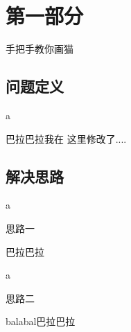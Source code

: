 \section{第一部分}
\begin{frame}{手把手教你画猫}
\end{frame}
\subsection{问题定义}
\begin{frame}{a}
	\begin{defi}
		巴拉巴拉我在 这里修改了....
	\end{defi}
\end{frame}
\subsection{解决思路}
\begin{frame}{a}
	\begin{solu}
		思路一
	\end{solu}
	\vspace{1.4cm}
	巴拉巴拉
\end{frame}

\begin{frame}{a}	
	\setcounter{solu}{1}
	\begin{solu}
		思路二
	\end{solu}
	\vspace{1.4cm}
	balabal巴拉巴拉
\end{frame}
